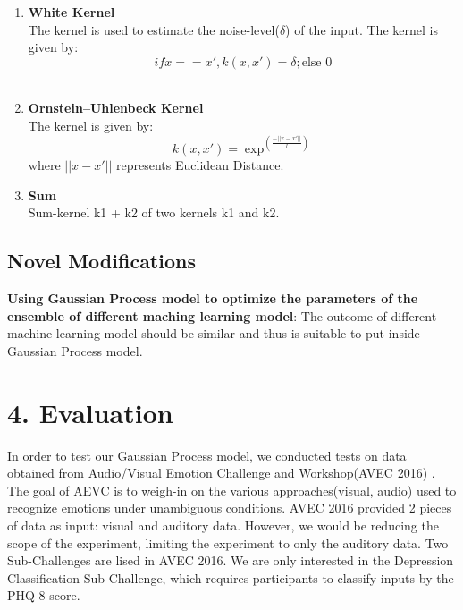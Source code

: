 \documentclass{article}
\begin{document}
\begin{enumerate}
		\item \textbf{White Kernel}\\
		The kernel is used to estimate the noise-level(\(\delta\)) of the input. 
		The kernel is given by:
		\begin{equation}\label{eq:kernel_noise}
			if x == x', k(x,x') = \delta ; \text{else 0}
		\end{equation}
		\\

		\item \textbf{Ornstein–Uhlenbeck Kernel}\\
		The kernel is given by:
		\begin{equation}\label{eq:kernel_ou}
			k(x,x') = \exp^{(\frac{-||x - x'||}{l})}
		\end{equation}
		where \(||x - x'||\) represents Euclidean Distance. \\

		\item \textbf{Sum}\\
		Sum-kernel k1 + k2 of two kernels k1 and k2.\\
	\end{enumerate}

	\subsection{Novel Modifications}
	\textbf{Using Gaussian Process model to optimize the parameters of the ensemble of different maching learning model}: 
	The outcome of different machine learning model should be similar and thus is suitable to put inside Gaussian Process model.

	\section{4. Evaluation}
	In order to test our Gaussian Process model, we conducted tests on data obtained from Audio/Visual Emotion Challenge and Workshop(AVEC 2016) \cite{avec2016}. The goal of AEVC is to weigh-in on the various approaches(visual, audio) used to recognize emotions under unambiguous conditions. AVEC 2016 provided 2 pieces of data as input: visual and auditory data. However, we would be reducing the scope of the experiment, limiting the experiment to only the auditory data. Two Sub-Challenges are lised in AVEC 2016. We are only interested in the Depression Classification Sub-Challenge, which requires participants to classify inputs by the PHQ-8 score.
\end{document}

